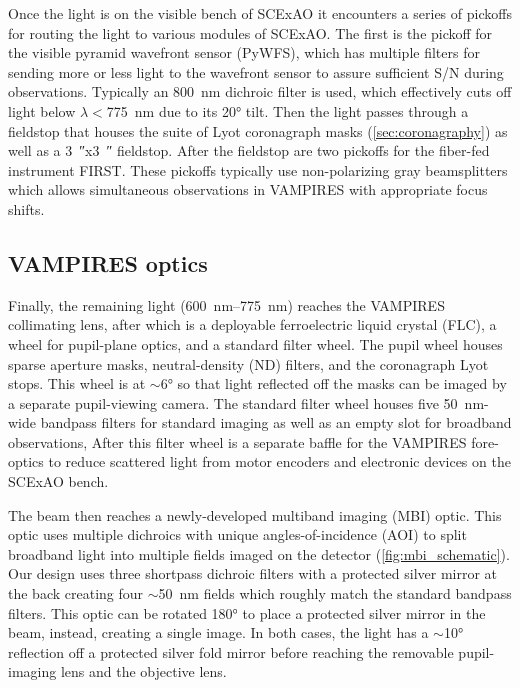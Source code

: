 Once the light is on the visible bench of SCExAO it encounters a series of pickoffs for routing the light to various modules of SCExAO. The first is the pickoff for the visible pyramid wavefront sensor (PyWFS), which has multiple filters for sending more or less light to the wavefront sensor to assure sufficient S/N during observations. Typically an \SI{800}{\nano\meter} dichroic filter is used, which effectively cuts off light below $\lambda <$\SI{775}{\nano\meter} due to its \ang{20} tilt. Then the light passes through a fieldstop that houses the suite of Lyot coronagraph masks (\autoref{sec:coronagraphy}) as well as a \SI{3}{\arcsecond}x\SI{3}{\arcsecond} fieldstop. After the fieldstop are two pickoffs for the fiber-fed instrument FIRST. These pickoffs typically use non-polarizing gray beamsplitters which allows simultaneous observations in VAMPIRES with appropriate focus shifts.

\subsection{VAMPIRES optics}
Finally, the remaining light (\SIrange{600}{775}{\nano\meter}) reaches the VAMPIRES collimating lens, after which is a deployable ferroelectric liquid crystal (FLC), a wheel for pupil-plane optics, and a standard filter wheel. The pupil wheel houses sparse aperture masks, neutral-density (ND) filters, and the coronagraph Lyot stops. This wheel is at $\sim$\ang{6} so that light reflected off the masks can be imaged by a separate pupil-viewing camera. The standard filter wheel houses five \SI{50}{\nano\meter}-wide bandpass filters for standard imaging as well as an empty slot for broadband observations, After this filter wheel is a separate baffle for the VAMPIRES fore-optics to reduce scattered light from motor encoders and electronic devices on the SCExAO bench. 

The beam then reaches a newly-developed multiband imaging (MBI) optic. This optic uses multiple dichroics with unique angles-of-incidence (AOI) to split broadband light into multiple fields imaged on the detector (\autoref{fig:mbi_schematic}). Our design uses three shortpass dichroic filters with a protected silver mirror at the back creating four $\sim$\SI{50}{\nano\meter} fields which roughly match the standard bandpass filters. This optic can be rotated \ang{180} to place a protected silver mirror in the beam, instead, creating a single image. In both cases, the light has a $\sim$\ang{10} reflection off a protected silver fold mirror before reaching the removable pupil-imaging lens and the objective lens.

